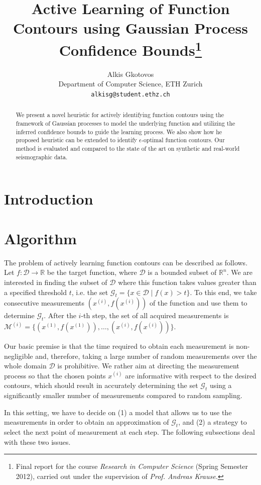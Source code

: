 \documentclass[11pt]{article} %
\title{Active Learning of Function Contours using Gaussian Process Confidence Bounds\thanks{Final
report for the course \emph{Research in Computer Science} (Spring
Semester 2012), carried out under the supervision of \emph{Prof. Andreas Krause.}}}
\author{
Alkis Gkotovos\\
Department of Computer Science, ETH Zurich\\
\texttt{alkisg@student.ethz.ch}
}
\begin{document}
\maketitle

\begin{abstract}
We present a novel heuristic for actively identifying function
contours using the framework of Gaussian processes to model the underlying
function and utilizing the
inferred confidence bounds to guide the learning process. We also show how
he proposed heuristic can be extended to identify $\epsilon$-optimal function
contours. Our method is evaluated and compared to the state of the art on
synthetic and real-world seismographic data.
\end{abstract}

\section{Introduction}


\section{Algorithm}
The problem of actively learning function contours can be described as follows.
Let ${f : \mathcal{D} \to \mathbb{R}}$ be the target function, where
$\mathcal{D}$ is a bounded subset of $\mathbb{R}^n$. We are interested in
finding the subset of $\mathcal{D}$ where this function takes values greater
than a specified threshold $t$, i.e. the set
$\mathcal{G}_t = \{x \in \mathcal{D} \mid f(x) > t\}$. To this end, we take
consecutive measurements $(x^{(i)}, f(x^{(i)}))$ of the function
and use them to determine $\mathcal{G}_t$. After the $i$-th step, the set of
all acquired measurements is
$\mathcal{M}^{(i)} = \{(x^{(1)}, f(x^{(1)})),\ldots,(x^{(i)}, f(x^{(i)}))\}$.

Our basic premise is that the time required to obtain each measurement is
non-negligible and, therefore, taking a large number of random measurements
over the whole domain $\mathcal{D}$ is prohibitive. We rather aim at directing
the measurement process so that the chosen points $x^{(i)}$ are informative with
respect to the desired contours, which should result in accurately determining
the set $\mathcal{G}_t$ using a significantly smaller number of measurements
compared to random sampling.

In this setting, we have to decide on (1) a model that allows us to use the
measurements in order to obtain an approximation of $\mathcal{G}_t$, and (2) a
strategy to select the next point of measurement at each step. The following
subsections deal with these two issues.
\end{document}
